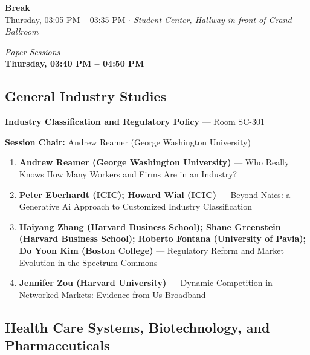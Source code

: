 \documentclass[
  10pt,
  letterpaper,
  DIV=11,
  numbers=noendperiod]{scrartcl}
\begin{document}
\vspace{1em}


\begin{center}
\colorbox{event!15}{\parbox{0.9\linewidth}{\centering
  \textcolor{event}{\large\textbf{Break}}\\[2pt]
  {\small Thursday, 03:05 PM – 03:35 PM $\cdot$ \textit{Student Center, Hallway in front of Grand Ballroom}}
}}
\end{center}

\vspace{1em}


\begin{center}
\normalsize\textit{Paper Sessions}\\[0.3em]
\Large\textbf{Thursday, 03:40 PM – 04:50 PM}
\end{center}

\subsection{\texorpdfstring{\textcolor{gis}{General Industry Studies}}{}}\label{section-40}

\textbf{Industry Classification and Regulatory Policy} --- Room SC-301

\textbf{Session Chair:} Andrew Reamer (George Washington University)

\begin{enumerate}
\def\labelenumi{\arabic{enumi}.}
\item
  \textbf{Andrew Reamer (George Washington University)} --- Who Really
  Knows How Many Workers and Firms Are in an Industry?
\item
  \textbf{Peter Eberhardt (ICIC); Howard Wial (ICIC)} --- Beyond Naics:
  a Generative Ai Approach to Customized Industry Classification
\item
  \textbf{Haiyang Zhang (Harvard Business School); Shane Greenstein
  (Harvard Business School); Roberto Fontana (University of Pavia); Do
  Yoon Kim (Boston College)} --- Regulatory Reform and Market Evolution
  in the Spectrum Commons
\item
  \textbf{Jennifer Zou (Harvard University)} --- Dynamic Competition in
  Networked Markets: Evidence from Us Broadband
\end{enumerate}

\subsection{\texorpdfstring{\textcolor{health}{Health Care Systems, Biotechnology, and Pharmaceuticals}}{}}\label{section-41}
\end{document}
